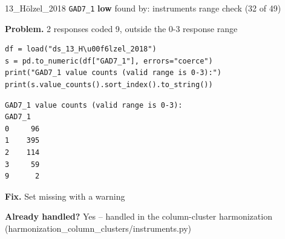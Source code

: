 \documentclass[9pt, t, handout]{beamer}
\newcommand{\ans}[1]{\textcolor{structure.fg}{#1}}
\begin{document}
\begin{frame}[fragile]{13\_Hölzel\_2018 \quad \texttt{GAD7\_1}}
  {\scriptsize\textcolor{black!55}{\textbf{low}} \quad
   found by: instruments range check \quad (32 of 49)}
  \vspace{3pt}

  {\footnotesize \textbf{Problem.} 2 responses coded 9, outside the 0-3 response range}
  \vspace{4pt}

  \begin{Verbatim}[fontsize=\tiny, frame=single, framesep=2pt, label=\tiny reproduce]
df = load("ds_13_H\u00f6lzel_2018")
s = pd.to_numeric(df["GAD7_1"], errors="coerce")
print("GAD7_1 value counts (valid range is 0-3):")
print(s.value_counts().sort_index().to_string())
  \end{Verbatim}
  \begin{Verbatim}[fontsize=\tiny, frame=single, framesep=2pt, label=\tiny output]
GAD7_1 value counts (valid range is 0-3):
GAD7_1
0     96
1    395
2    114
3     59
9      2
  \end{Verbatim}
  \vspace{2pt}

  {\footnotesize \textbf{Fix.} Set missing with a warning}
  \vspace{2pt}

  {\footnotesize \textbf{Already handled?} \ans{Yes} -- handled in the column-cluster harmonization
   (harmonization\_column\_clusters/instruments.py)}
\end{frame}
\end{document}

